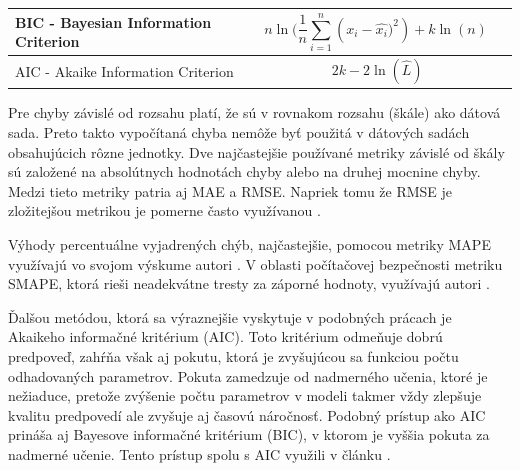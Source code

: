 \documentclass[thesismargins, thesislinespacing, openright, upjsfrontpage, combineabstracts]{rnthesis}
\begin{document}
\begin{longtable}[p]{ | p{4cm} | p{5cm} | p{5cm} | }
     \hline BIC - Bayesian Information Criterion & $${n\ln({\frac {1}{n}}\sum _{i=1}^{n}({x_{i}-{\widehat {x_{i}}})^{2}})+k\ln(n)\ }$$ & \cite{tang2016exploiting} \\
     \hline AIC - Akaike Information Criterion & $${2k-2\ln({\hat {L}})}$$ & \cite{tang2016exploiting,zhan2015predicting,wei2012intrusion} \\
     \hline

\end{longtable}


Pre chyby závislé od rozsahu platí, že sú v rovnakom rozsahu (škále) ako dátová sada. Preto takto vypočítaná chyba nemôže byť použitá v dátových sadách obsahujúcich rôzne jednotky. Dve najčastejšie používané metriky závislé od škály sú založené na absolútnych hodnotách chyby alebo na druhej mocnine chyby. Medzi tieto metriky patria aj MAE a RMSE. Napriek tomu že RMSE je zložitejšou metrikou je pomerne často využívanou \cite{tang2018disclosure,tang2017big,condon2008analysis}. 

Výhody percentuálne vyjadrených chýb, najčastejšie, pomocou metriky MAPE využívajú vo svojom výskume autori \cite{jiang2004detecting,cortez2012multi,fang2019deep,tang2018disclosure,werner2017time}. V oblasti počítačovej bezpečnosti metriku SMAPE, ktorá rieši neadekvátne tresty za záporné hodnoty, využívajú autori \cite{roumani2015time,pokhrel2017cybersecurity}.

Ďalšou metódou, ktorá sa výraznejšie vyskytuje v podobných prácach \cite{tang2016exploiting,zhan2015predicting,wei2012intrusion} je Akaikeho informačné kritérium (AIC). Toto kritérium odmeňuje dobrú predpoveď, zahŕňa však aj pokutu, ktorá je zvyšujúcou sa funkciou počtu odhadovaných parametrov. Pokuta zamedzuje od nadmerného učenia, ktoré je nežiaduce, pretože zvýšenie počtu parametrov v modeli takmer vždy zlepšuje kvalitu predpovedí ale zvyšuje aj časovú náročnosť. Podobný prístup ako AIC prináša aj Bayesove informačné kritérium (BIC), v ktorom je vyššia pokuta za nadmerné učenie. Tento prístup spolu s AIC využili v článku \cite{tang2016exploiting}.

\end{document}
